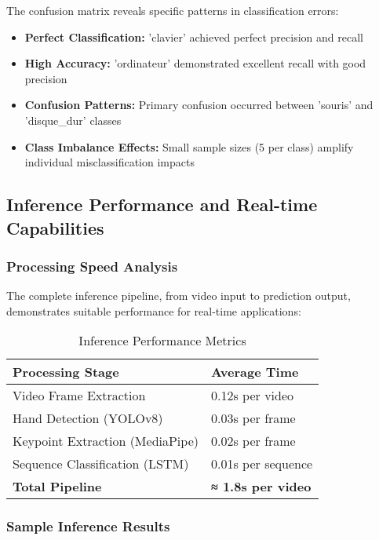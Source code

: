 \documentclass[11pt, a4paper]{article}
\begin{document}
The confusion matrix reveals specific patterns in classification errors:

\begin{itemize}
    \item \textbf{Perfect Classification:} 'clavier' achieved perfect precision and recall
    \item \textbf{High Accuracy:} 'ordinateur' demonstrated excellent recall with good precision
    \item \textbf{Confusion Patterns:} Primary confusion occurred between 'souris' and 'disque\_dur' classes
    \item \textbf{Class Imbalance Effects:} Small sample sizes (5 per class) amplify individual misclassification impacts
\end{itemize}

\subsection{Inference Performance and Real-time Capabilities}

\subsubsection{Processing Speed Analysis}

The complete inference pipeline, from video input to prediction output, demonstrates suitable performance for real-time applications:

\begin{table}[H]
    \centering
    \caption{Inference Performance Metrics}
    \label{tab:inference_performance}
    \begin{tabular}{@{}ll@{}}
        \toprule
        \textbf{Processing Stage} & \textbf{Average Time} \\ \midrule
        Video Frame Extraction & 0.12s per video \\
        Hand Detection (YOLOv8) & 0.03s per frame \\
        Keypoint Extraction (MediaPipe) & 0.02s per frame \\
        Sequence Classification (LSTM) & 0.01s per sequence \\
        \textbf{Total Pipeline} & \textbf{≈ 1.8s per video} \\ \bottomrule
    \end{tabular}
\end{table}

\subsubsection{Sample Inference Results}
\end{document}
